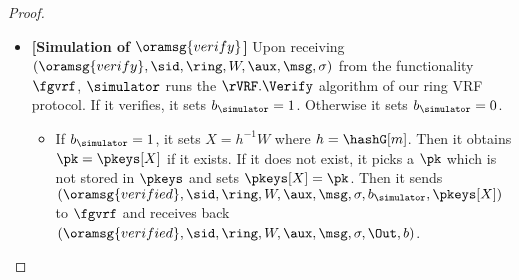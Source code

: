 \begin{proof}
\begin{itemize}
		
		
		
		\item \textbf{[Simulation of $ \oramsg{verify} $]} Upon receiving  $(\oramsg{verify}, \sid, \ring,W, \aux,\msg, \sigma)$ from the functionality $\fgvrf$, $ \simulator $ runs the $ \rVRF.\Verify $ algorithm of our ring VRF protocol. If  it verifies, it sets $ b_{\simulator} =1 $. Otherwise it sets $ b_{\simulator} =0  $.
		
		\begin{itemize}
			\item 		If $ b_\simulator = 1 $, it sets $ X = h^{-1} W$ where $ h = \mathtt{\hashG}[m] $. Then it obtains $ \pk  = \pkeys[X]$ if it exists. If it does not exist, it picks a $ \pk  $ which is not stored in $ \pkeys $ and sets $ \pkeys[X] = \pk $. Then it sends  $ (\oramsg{verified}, \sid, \ring, W,\aux,\msg, \sigma, b_\simulator, \pkeys[X]) $ to $ \fgvrf $ and receives back $ (\oramsg{verified}, \sid, \ring, W, \aux, \msg, \sigma, \Out, b) $. 
			

\end{itemize}
\end{itemize}
\end{proof}
